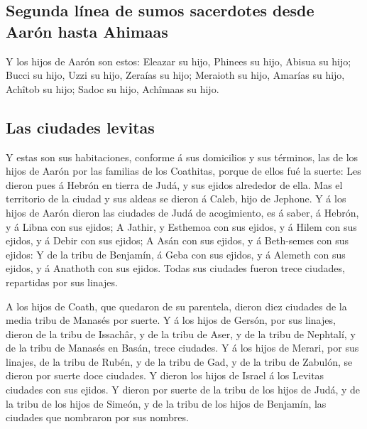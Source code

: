 \hypertarget{segunda-luxednea-de-sumos-sacerdotes-desde-aaruxf3n-hasta-ahimaas}{%
\subsection{Segunda línea de sumos sacerdotes desde Aarón hasta
Ahimaas}\label{segunda-luxednea-de-sumos-sacerdotes-desde-aaruxf3n-hasta-ahimaas}}

 Y los hijos de Aarón son estos: Eleazar su hijo, Phinees
su hijo, Abisua su hijo;  Bucci su hijo, Uzzi su hijo,
Zeraías su hijo;  Meraioth su hijo, Amarías su hijo,
Achîtob su hijo;  Sadoc su hijo, Achîmaas su hijo.

\hypertarget{las-ciudades-levitas}{%
\subsection{Las ciudades levitas}\label{las-ciudades-levitas}}

 Y estas son sus habitaciones, conforme á sus domicilios y
sus términos, las de los hijos de Aarón por las familias de los
Coathitas, porque de ellos fué la suerte:  Les dieron pues
á Hebrón en tierra de Judá, y sus ejidos alrededor de ella.
 Mas el territorio de la ciudad y sus aldeas se dieron á
Caleb, hijo de Jephone.  Y á los hijos de Aarón dieron las
ciudades de Judá de acogimiento, es á saber, á Hebrón, y á Libna con sus
ejidos;  A Jathir, y Esthemoa con sus ejidos, y á Hilem con
sus ejidos, y á Debir con sus ejidos;  A Asán con sus
ejidos, y á Beth-semes con sus ejidos:  Y de la tribu de
Benjamín, á Geba con sus ejidos, y á Alemeth con sus ejidos, y á
Anathoth con sus ejidos. Todas sus ciudades fueron trece ciudades,
repartidas por sus linajes.

 A los hijos de Coath, que quedaron de su parentela, dieron
diez ciudades de la media tribu de Manasés por suerte.  Y á
los hijos de Gersón, por sus linajes, dieron de la tribu de Issachâr, y
de la tribu de Aser, y de la tribu de Nephtalí, y de la tribu de Manasés
en Basán, trece ciudades.  Y á los hijos de Merari, por sus
linajes, de la tribu de Rubén, y de la tribu de Gad, y de la tribu de
Zabulón, se dieron por suerte doce ciudades.  Y dieron los
hijos de Israel á los Levitas ciudades con sus ejidos.  Y
dieron por suerte de la tribu de los hijos de Judá, y de la tribu de los
hijos de Simeón, y de la tribu de los hijos de Benjamín, las ciudades
que nombraron por sus nombres.

